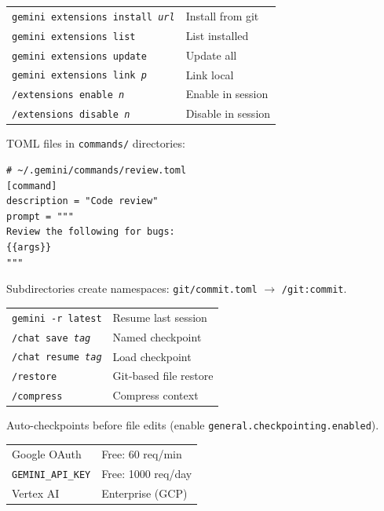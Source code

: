 \documentclass[9pt]{extarticle}
\newcommand{\sect}[1]{\needspace{4\baselineskip}\vspace{6pt}{\footnotesize\bfseries\scshape #1}\par\vspace{2pt}}
\begin{document}
\begin{multicols}{3}
\sect{Extensions}
\begin{tabularx}{\linewidth}{@{}l@{\enspace}Y@{}}
\texttt{gemini extensions install \textit{url}} & Install from git \\
\texttt{gemini extensions list}      & List installed \\
\texttt{gemini extensions update}   & Update all \\
\texttt{gemini extensions link \textit{p}} & Link local \\
\texttt{/extensions enable \textit{n}} & Enable in session \\
\texttt{/extensions disable \textit{n}} & Disable in session \\
\end{tabularx}

\sect{Custom Commands}
{\footnotesize TOML files in \texttt{commands/} directories:
\begin{verbatim}
# ~/.gemini/commands/review.toml
[command]
description = "Code review"
prompt = """
Review the following for bugs:
{{args}}
"""
\end{verbatim}
}
{\footnotesize Subdirectories create namespaces: \texttt{git/commit.toml} $\to$ \texttt{/git:commit}.}

\sect{Sessions \& Checkpointing}
\begin{tabularx}{\linewidth}{@{}l@{\enspace}Y@{}}
\texttt{gemini -r latest}            & Resume last session \\
\texttt{/chat save \textit{tag}}    & Named checkpoint \\
\texttt{/chat resume \textit{tag}}  & Load checkpoint \\
\texttt{/restore}                    & Git-based file restore \\
\texttt{/compress}                   & Compress context \\
\end{tabularx}
{\footnotesize Auto-checkpoints before file edits (enable \texttt{general.checkpointing.enabled}).}

\sect{Authentication}
\begin{tabularx}{\linewidth}{@{}l@{\enspace}Y@{}}
Google OAuth                         & Free: 60 req/min \\
\texttt{GEMINI\_API\_KEY}           & Free: 1000 req/day \\
Vertex AI                            & Enterprise (GCP) \\
\end{tabularx}


\end{multicols}
\end{document}

